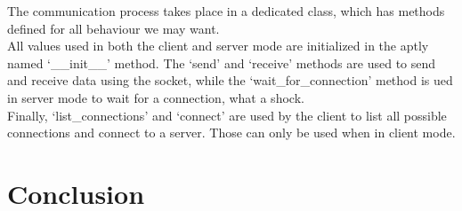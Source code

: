 \documentclass[11pt, a4paper, oneside]{report}
\begin{document}
	The communication process takes place in a dedicated class, which has methods defined for all behaviour we may want. \\
	All values used in both the client and server mode are initialized in the aptly named `\_\_init\_\_' method. The `send' and `receive' methods are used to send and receive data using the socket, while the `wait\_for\_connection' method is ued in server mode to wait for a connection, what a shock. \\
	Finally, `list\_connections' and `connect' are used by the client to list all possible connections and connect to a server. Those can only be used when in client mode.
	
	\chapter{Conclusion}
	
\end{document}
